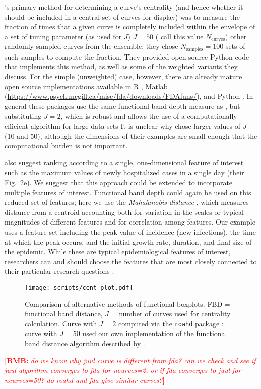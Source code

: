 \documentclass[12pt]{article}
\newcommand{\comment}{\showcomment}
\newcommand{\showcomment}[3]{\textcolor{#1}{\textbf{[#2: }\textsl{#3}\textbf{]}}}
\newcommand{\ncurve}{\ensuremath{N_{\textrm{curves}}}\xspace}
\newcommand{\nsample}{\ensuremath{N_{\textrm{samples}}}\xspace}
\newcommand{\bmb}[1]{\comment{red}{BMB}{#1}}
\theoremstyle{definition} %
\begin{document}
\cite{juul2021fixed}'s primary method for determining a curve's centrality (and hence whether it should be included in a central set of curves for display) was to measure the fraction of times that a given curve is completely included within the envelope of a set of tuning parameter (as \cite{lopez2009concept} used for $J$) $J=50$ (\cite{juul2021fixed} call this value \ncurve) other randomly sampled curves from the ensemble; they chose $\nsample=100$ sets of such samples to compute the fraction. They provided open-source Python code that implements this method, as well as some of the weighted variants they discuss. For the simple (unweighted) case, however, there are already mature open source implementations available in R \citep{fda_pkg,roahd}, Matlab (\url{https://www.psych.mcgill.ca/misc/fda/downloads/FDAfuns/}), and Python \citep{seabold2010statsmodels}. In general these packages use the same functional band depth measure as \cite{juul2021fixed}, but substituting $J=2$, which is robust \citep{lopez2009concept} and allows the use of a computationally efficient algorithm for large data sets \citep{sun2012exact}
It is unclear why \cite{juul2021fixed} chose larger values of $J$ (10 and 50), although the dimensions of their examples are small enough that the computational burden is not important.

\cite{juul2021fixed} also suggest ranking according to a single, one-dimensional feature of interest such as the maximum values of newly hospitalized cases in a single day (their Fig.~2e). We suggest that this approach could be extended to incorporate multiple features of interest. Functional band depth could again be used on this reduced set of features; here we use the \emph{Mahalanobis distance} \citep{mahalanobis1936generalized}, which measures distance from a centroid accounting both for variation in the scales or typical magnitudes of different features and for correlation among features.
Our example uses a feature set including the peak value of incidence (new infections), the time at which the peak occurs, and the initial growth rate, duration, and final size of the epidemic. While these are typical epidemiological features of interest, researchers can and should choose the features that are most closely connected to their particular research questions \citep{probert2016decision}.

\begin{figure}[h!]
  \centering
  \texttt{[image: scripts/cent\_plot.pdf]}
  \caption{Comparison of alternative methods of functional boxplots. FBD = functional band distance, $J$ = number of curves used for centrality calculation. Curve with $J=2$ computed via the \texttt{roahd} package \citep{roahd}: curve with $J=50$ used our own implementation of the functional band distance algorithm described by \cite{juul2021fixed}.
  }
  \label{p.a}
\end{figure}

\bmb{do we know why juul curve is different from fda? can we check and see if juul algorithm converges to fda for ncurves=2, or if fda converges to juul for ncurves=50? do roahd and fda give similar curves?}
  

\end{document}
